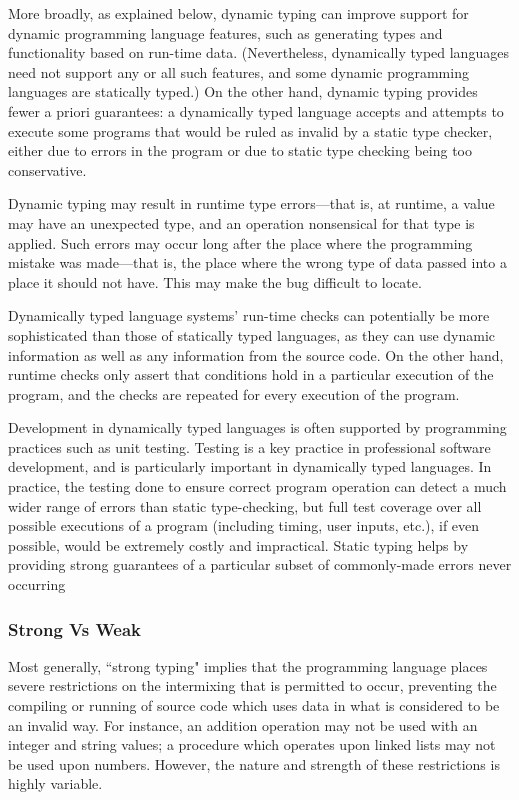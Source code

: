 \documentclass[a4paper,oneside]{report}
\begin{document}
 		More broadly, as explained below, dynamic typing can improve support for dynamic programming language features, such as generating types and functionality based on run-time data. (Nevertheless, dynamically typed languages need not support any or all such features, and some dynamic programming languages are statically typed.) On the other hand, dynamic typing provides fewer a priori guarantees: a dynamically typed language accepts and attempts to execute some programs that would be ruled as invalid by a static type checker, either due to errors in the program or due to static type checking being too conservative.

 		 Dynamic typing may result in runtime type errors—that is, at runtime, a value may have an unexpected type, and an operation nonsensical for that type is applied. Such errors may occur long after the place where the programming mistake was made—that is, the place where the wrong type of data passed into a place it should not have. This may make the bug difficult to locate.

 		Dynamically typed language systems' run-time checks can potentially be more sophisticated than those of statically typed languages, as they can use dynamic information as well as any information from the source code. On the other hand,  runtime checks only assert that conditions hold in a particular execution of the program, and the checks are repeated for every execution of the program.

		Development in dynamically typed languages is often supported by programming practices such as unit testing. Testing is a key practice in professional software development, and is particularly important in dynamically typed languages. In practice, the testing done to ensure correct program operation can detect a much wider range of errors than static type-checking, but full test coverage over all possible executions of a program (including timing, user inputs, etc.), if even  possible, would be extremely costly and impractical. Static typing helps by providing strong guarantees of a particular subset of commonly-made errors never occurring


		\subsubsection{Strong Vs Weak}
			
		Most generally, ``strong typing" implies that the programming language places severe restrictions on the intermixing that is permitted to occur, preventing the compiling or running of source code which uses data in what is considered to be an invalid way. For instance, an addition operation may not be used with an integer and string values; a procedure which operates upon linked lists may not be used upon numbers. However, the nature and strength of these restrictions is highly variable.
\end{document}
